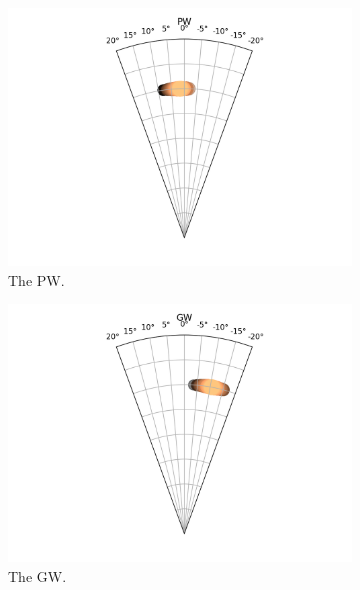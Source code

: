 \documentclass{kththesis}
\begin{document}
\begin{figure}
    \centering
    \begin{subfigure}{0.4\textwidth}
    \centering
    \includegraphics[width=\textwidth]{AgentDirectionChoices/MPDQN_Ullna_Direction_Choices_PW.png} 
    \caption{The PW.}
    \label{fig:PW_ullna_deviation}
    \end{subfigure}
    \begin{subfigure}{0.4\textwidth}
    \centering
    \includegraphics[width=\textwidth]{AgentDirectionChoices/MPDQN_Ullna_Direction_Choices_GW.png} 
    \caption{The GW.}
    \label{fig:GW_ullna_deviation}
    \end{subfigure}
    \begin{subfigure}{0.4\textwidth}

\end{subfigure}
\end{figure}
\end{document}
